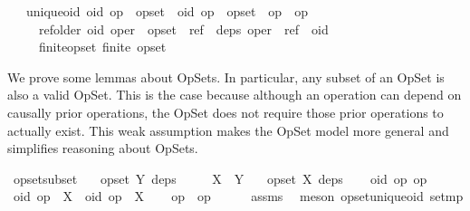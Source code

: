 \begin{isabellebody}
\ \ \ unique{\isacharunderscore}oid{\isacharcolon}\ {\isachardoublequoteopen}{\isacharparenleft}oid{\isacharcomma}\ op{}{\isacharparenright}\ {\isasymin}\ opset\ {\isasymLongrightarrow}\ {\isacharparenleft}oid{\isacharcomma}\ op{}{\isacharparenright}\ {\isasymin}\ opset\ {\isasymLongrightarrow}\ op{}\ {\isacharequal}\ op{}{\isachardoublequoteclose}\isanewline
\ \ \ \ \ ref{\isacharunderscore}older{\isacharcolon}\ {\isachardoublequoteopen}{\isacharparenleft}oid{\isacharcomma}\ oper{\isacharparenright}\ {\isasymin}\ opset\ {\isasymLongrightarrow}\ ref\ {\isasymin}\ deps\ oper\ {\isasymLongrightarrow}\ ref\ {\isacharless}\ oid{\isachardoublequoteclose}\isanewline
\ \ \ \ \ finite{\isacharunderscore}opset{\isacharcolon}\ {\isachardoublequoteopen}finite\ opset{\isachardoublequoteclose}%
\begin{isamarkuptext}%
We prove some lemmas about OpSets. In particular, any subset of an OpSet
is also a valid OpSet. This is the case because although an operation can
depend on causally prior operations, the OpSet does not require those prior
operations to actually exist. This weak assumption makes the OpSet model
more general and simplifies reasoning about OpSets.%
\end{isamarkuptext}\isamarkuptrue%
\isamarkupfalse%
\ opset{\isacharunderscore}subset{\isacharcolon}\isanewline
\ \ \ {\isachardoublequoteopen}opset\ Y\ deps{\isachardoublequoteclose}\isanewline
\ \ \ \ \ {\isachardoublequoteopen}X\ {\isasymsubseteq}\ Y{\isachardoublequoteclose}\isanewline
\ \ \ {\isachardoublequoteopen}opset\ X\ deps{\isachardoublequoteclose}\isanewline
%
\isadelimproof
%
\endisadelimproof
%
\isatagproof
{}\isamarkupfalse%
\isanewline
\ \ \isamarkupfalse%
\ oid\ op{}\ op{}\isanewline
\ \ \isamarkupfalse%
\ {\isachardoublequoteopen}{\isacharparenleft}oid{\isacharcomma}\ op{}{\isacharparenright}\ {\isasymin}\ X{\isachardoublequoteclose}\ \ {\isachardoublequoteopen}{\isacharparenleft}oid{\isacharcomma}\ op{}{\isacharparenright}\ {\isasymin}\ X{\isachardoublequoteclose}\isanewline
\ \ \isamarkupfalse%
\ {\isachardoublequoteopen}op{}\ {\isacharequal}\ op{}{\isachardoublequoteclose}\isanewline
\ \ \ \ \isamarkupfalse%
\ assms\ \isamarkupfalse%
\ {\isacharparenleft}meson\ opset{\isachardot}unique{\isacharunderscore}oid\ set{\isacharunderscore}mp{\isacharparenright}\isanewline

\end{isabellebody}
